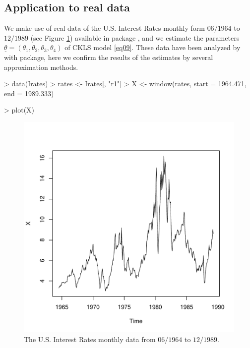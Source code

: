\subsection{Application to real data}
We make use of real data of the U.S. Interest Rates monthly form $06/1964$ to $12/1989$ (see Figure \ref{fig1}) available in package  \citep{Croissant2014}, and we estimate the parameters $\underline{\theta}=(\theta_{1},\theta_{2},\theta_{3},\theta_{4})$ of CKLS model \eqref{eq09}. These data have been analyzed by \citet{Stefano2014} with  package, here we confirm the results of the estimates by several approximation methods.
\begin{Schunk}
\begin{Sinput}
> data(Irates)
> rates <- Irates[, "r1"]
> X <- window(rates, start = 1964.471, end = 1989.333)
\end{Sinput}
\end{Schunk}
\begin{Schunk}
\begin{Sinput}
> plot(X)
\end{Sinput}
\end{Schunk}
\begin{figure}[!ht]
\begin{center}
\includegraphics{FitSDE-022}
\end{center}
\caption{The U.S. Interest Rates monthly data from $06/1964$ to $12/1989$.}\label{fig1}
\end{figure}

